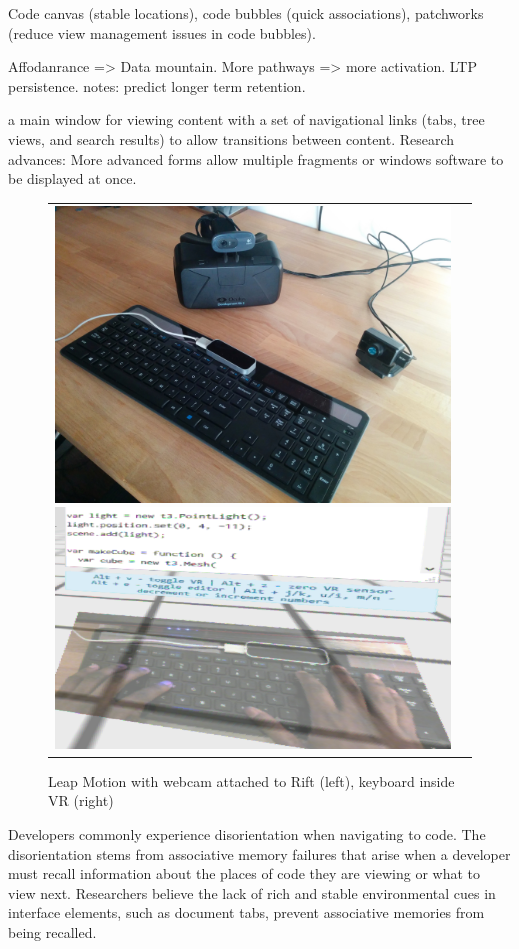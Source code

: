 \documentclass[conference]{IEEEtran}
\begin{document}
Code canvas (stable locations), code bubbles (quick associations), patchworks (reduce view management issues in code bubbles).

Affodanrance =>
Data mountain. More pathways => more activation. LTP persistence. notes: predict longer term retention.

a main window for viewing content with a set of navigational links (tabs, tree views, and search results) to allow transitions between content.  
Research advances: More advanced forms allow multiple fragments or windows software to be displayed at once.


\begin{figure}[ht!]
\centering
\begin{tabular}{cc}
	\includegraphics[width=.45\linewidth]{figures/setup/equipment}\label{fig:rift}
 	\includegraphics[width=.45\linewidth]{figures/setup/webcam_passthrough}\label{fig:leap}
\end{tabular}
\caption{Leap Motion with webcam attached to Rift (left), keyboard inside VR (right)}
\end{figure}

Developers commonly experience disorientation when navigating to code. 
The disorientation stems from associative memory failures that arise when a developer must recall information about the places of code they are viewing or what to view next.
Researchers believe the lack of rich and stable environmental cues in interface elements, such as document tabs, 
prevent associative memories from being recalled.
\end{document}
